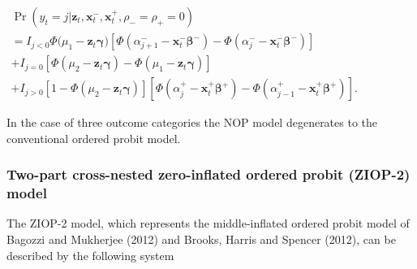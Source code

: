 \documentclass[letterpaper,fleqn,12pt]{article}
\begin{document}
\begin{onehalfspace}
\begin{center}
$%
\begin{array}{l}
\Pr (y_{t}=j|\mathbf{z}_{t},\mathbf{x}_{t}^{-},\mathbf{x}_{t}^{+},\rho
_{-}=\rho _{+}=0) \\ 
=I_{j<0}\Phi (\mu _{1}-\mathbf{z}_{t}\mathbf{\gamma )}[\Phi (\alpha
_{j+1}^{-}-\mathbf{x}_{t}^{-}\mathbf{\beta }^{-})-\Phi (\alpha _{j}^{-}-%
\mathbf{x}_{t}^{-}\mathbf{\beta }^{-})] \\ 
+I_{j=0}[\Phi (\mu _{2}-\mathbf{z}_{t}\mathbf{\gamma })-\Phi (\mu _{1}-%
\mathbf{z}_{t}\mathbf{\gamma })] \\ 
+I_{j>0}[1-\Phi (\mu _{2}-\mathbf{z}_{t}\mathbf{\gamma })][\Phi (\alpha
_{j}^{+}-\mathbf{x}_{t}^{+}\mathbf{\beta }^{+})-\Phi (\alpha _{j-1}^{+}-%
\mathbf{x}_{t}^{+}\mathbf{\beta }^{+})]\text{.}%
\end{array}%
$
\end{center}

In the case of three outcome categories the NOP model degenerates to the
conventional ordered probit model.

\subsubsection*{Two-part cross-nested zero-inflated ordered probit (ZIOP-2)
model}

The ZIOP-2 model, which represents the middle-inflated ordered probit model
of Bagozzi and Mukherjee (2012) and Brooks, Harris and Spencer (2012), can
be described by the following system

\medskip


\end{onehalfspace}
\end{document}
